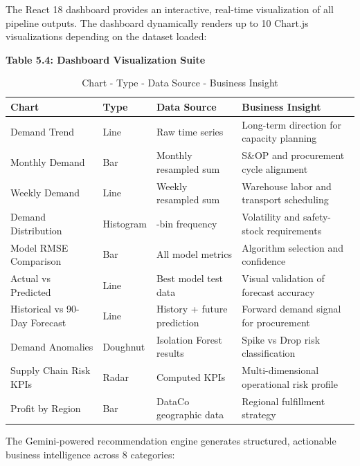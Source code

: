 \documentclass[12pt, a4paper]{report}
\begin{document}
The React 18 dashboard provides an interactive, real-time visualization of all pipeline outputs. The dashboard dynamically renders up to 10 Chart.js visualizations depending on the dataset loaded:

\textbf{Table 5.4: Dashboard Visualization Suite}

\begin{table}[H]
\centering
\caption{Chart - Type - Data Source - Business Insight}
\vspace{0.1in}
\begin{tabularx}{\textwidth}{|>{\raggedright\arraybackslash}X|>{\raggedright\arraybackslash}X|>{\raggedright\arraybackslash}X|>{\raggedright\arraybackslash}X|}
\hline
Chart & Type & Data Source & Business Insight \\ \hline
\hline
Demand Trend & Line & Raw time series & Long-term direction for capacity planning \\ \hline
Monthly Demand & Bar & Monthly resampled sum & S\&OP and procurement cycle alignment \\ \hline
Weekly Demand & Line & Weekly resampled sum & Warehouse labor and transport scheduling \\ \hline
Demand Distribution & Histogram & 20-bin frequency & Volatility and safety-stock requirements \\ \hline
Model RMSE Comparison & Bar & All model metrics & Algorithm selection and confidence \\ \hline
Actual vs Predicted & Line & Best model test data & Visual validation of forecast accuracy \\ \hline
Historical vs 90-Day Forecast & Line & History + future prediction & Forward demand signal for procurement \\ \hline
Demand Anomalies & Doughnut & Isolation Forest results & Spike vs Drop risk classification \\ \hline
Supply Chain Risk KPIs & Radar & Computed KPIs & Multi-dimensional operational risk profile \\ \hline
Profit by Region & Bar & DataCo geographic data & Regional fulfillment strategy \\ \hline
\end{tabularx}
\end{table}



The Gemini-powered recommendation engine generates structured, actionable business intelligence across 8 categories:
\end{document}
